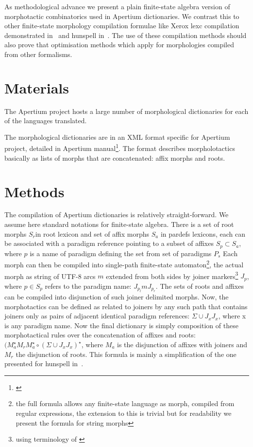 \documentclass[11pt,a4paper]{article}
\begin{document}
As methodological advance we present a plain finite-state algebra version of
morphotactic combinatorics used in Apertium dictionaries. We contrast this to
other finite-state morphology compilation formulae like Xerox lexc compilation
demonstrated in~\cite{pirinen/2009/sfcm} and hunspell in~\cite{pirinen/2010/cla}.
The use of these compilation methods should also prove that optimisation methods
which apply for morphologies compiled from other formalisms. 

\section{Materials}

The Apertium project hosts a large number of morphological dictionaries for
each of the languages translated. 

The morphological dictionaries are in an XML format specific for Apertium
project, detailed in Apertium manual\footnote{\url{}}. The format describes
morpholotactics basically as lists of morphs that are concatenated: affix
morphs and roots. 

\section{Methods}

The compilation of Apertium dictionaries is relatively straight-forward. We
assume here standard notations for finite-state algebra. There is a set of root
morphs $S_r$in root lexicon and set of affix morphs $S_a$ in pardefs lexicons,
each can be associated with a paradigm reference pointing to a subset of
affixes $S_p \subset S_a$, where $p$ is a name of paradigm defining the set
from set of paradigms $P_s$ Each morph can then be compiled into single-path
finite-state automaton\footnote{the full formula allows any finite-state
language as morph, compiled from regular expressions, the extension to this is
trivial but for readability we present the formula for string morphs}, the
actual morph as string of UTF-8 arcs $m$ extended from both sides by joiner
markers\footnote{ using terminology of \cite{pirinen/2009/sfcm}} $J_p$, where $p
\in S_p$ refers to the paradigm name: $J_{p_l} m J_{p_r}$. The sets of roots
and affixes can be compiled into disjunction of such joiner delimited morphs.
Now, the morphotactics can be defined as related to joiners by any such path
that contains joiners only as pairs of adjacent identical paradigm references:
$\Sigma \cup J_x J_x$, where x is any paradigm name. Now the final dictionary is
simply composition of these morphotactical rules over the concatenation of
affixes and roots: $(M_{a}^{\star} M_{r} M_{a}^{\star} \circ (\Sigma
\cup J_x J_x)^{\star}$, where $M_{a}$ is the disjunction of affixes with
joiners and $M_{r}$ the disjunction of roots.  This formula is mainly a
simplification of the one presented for hunspell in~\cite{pirinen/2010/cla}.
\end{document}
